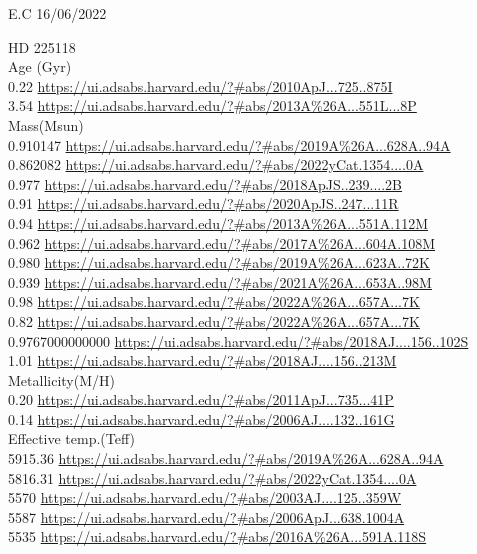 E.C 16/06/2022

HD 225118\\
Age (Gyr)\\
0.22 \url{https://ui.adsabs.harvard.edu/?#abs/2010ApJ...725..875I}\\
3.54 \url{https://ui.adsabs.harvard.edu/?#abs/2013A%26A...551L...8P}\\
Mass(Msun)\\
0.910147 \url{https://ui.adsabs.harvard.edu/?#abs/2019A%26A...628A..94A}\\
0.862082 \url{https://ui.adsabs.harvard.edu/?#abs/2022yCat.1354....0A}\\
0.977 \url{https://ui.adsabs.harvard.edu/?#abs/2018ApJS..239....2B}\\
0.91 \url{https://ui.adsabs.harvard.edu/?#abs/2020ApJS..247...11R}\\
0.94 \url{https://ui.adsabs.harvard.edu/?#abs/2013A%26A...551A.112M}\\
0.962 \url{https://ui.adsabs.harvard.edu/?#abs/2017A%26A...604A.108M}\\
0.980 \url{https://ui.adsabs.harvard.edu/?#abs/2019A%26A...623A..72K}\\
0.939 \url{https://ui.adsabs.harvard.edu/?#abs/2021A%26A...653A..98M}\\
0.98 \url{https://ui.adsabs.harvard.edu/?#abs/2022A%26A...657A...7K}\\
0.82 \url{https://ui.adsabs.harvard.edu/?#abs/2022A%26A...657A...7K}\\
0.9767000000000 \url{https://ui.adsabs.harvard.edu/?#abs/2018AJ....156..102S}\\
1.01 \url{https://ui.adsabs.harvard.edu/?#abs/2018AJ....156..213M}\\
Metallicity(M/H)\\
0.20 \url{https://ui.adsabs.harvard.edu/?#abs/2011ApJ...735...41P}\\
0.14 \url{https://ui.adsabs.harvard.edu/?#abs/2006AJ....132..161G}\\
Effective temp.(Teff)\\
5915.36 \url{https://ui.adsabs.harvard.edu/?#abs/2019A%26A...628A..94A}\\
5816.31 \url{https://ui.adsabs.harvard.edu/?#abs/2022yCat.1354....0A}\\
5570 \url{https://ui.adsabs.harvard.edu/?#abs/2003AJ....125..359W}\\
5587 \url{https://ui.adsabs.harvard.edu/?#abs/2006ApJ...638.1004A}\\
5535 \url{https://ui.adsabs.harvard.edu/?#abs/2016A%26A...591A.118S}\\
